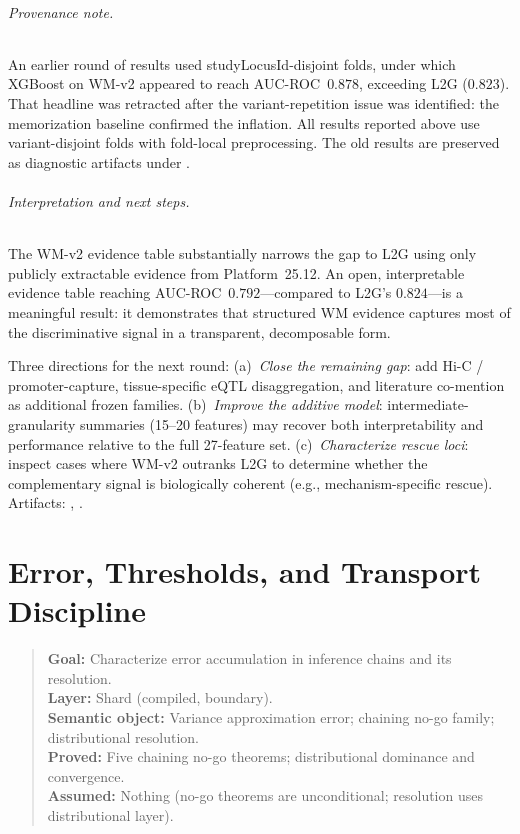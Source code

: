 \documentclass[11pt,openany]{report}
\begin{document}
\subparagraph{Provenance note.}
An earlier round of results used studyLocusId-disjoint folds, under
which XGBoost on WM-v2 appeared to reach AUC-ROC~$0.878$, exceeding
L2G ($0.823$).  That headline was retracted after the variant-repetition
issue was identified: the memorization baseline confirmed the inflation.
All results reported above use variant-disjoint folds with fold-local
preprocessing.  The old results are preserved as diagnostic artifacts
under .

\subparagraph{Interpretation and next steps.}
The WM-v2 evidence table substantially narrows the gap to L2G using
only publicly extractable evidence from Platform~25.12.  An open,
interpretable evidence table reaching AUC-ROC~$0.792$---compared to
L2G's $0.824$---is a meaningful result: it demonstrates that
structured WM evidence captures most of the discriminative signal
in a transparent, decomposable form.

Three directions for the next round:
(a)~\emph{Close the remaining gap}: add Hi-C / promoter-capture,
  tissue-specific eQTL disaggregation, and literature co-mention
  as additional frozen families.
(b)~\emph{Improve the additive model}: intermediate-granularity
  summaries (15--20 features) may recover both interpretability and
  performance relative to the full 27-feature set.
(c)~\emph{Characterize rescue loci}: inspect cases where WM-v2
  outranks L2G to determine whether the complementary signal is
  biologically coherent (e.g., mechanism-specific rescue).
Artifacts: ,
.

\chapter{Error, Thresholds, and Transport Discipline}
\label{ch:error-transport}

\begin{quote}\small
\textbf{Goal:} Characterize error accumulation in inference chains and its resolution.\\
\textbf{Layer:} Shard (compiled, boundary).\\
\textbf{Semantic object:} Variance approximation error; chaining no-go family; distributional resolution.\\
\textbf{Proved:} Five chaining no-go theorems; distributional dominance and convergence.\\
\textbf{Assumed:} Nothing (no-go theorems are unconditional; resolution uses distributional layer).
\end{quote}
\end{document}

